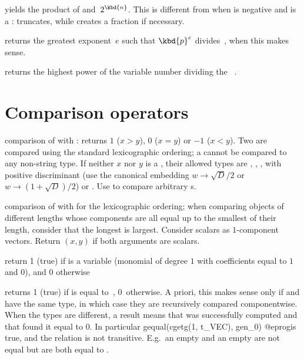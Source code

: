  yields the product of 
and~$2^{\kbd{n}}$. This is different from  when  is negative
and  is a :  truncates, while 
creates a fraction if necessary.

 returns the greatest exponent~$e$ such that
$\kbd{p}^e$ divides~, when this makes sense.

 returns the highest power of the variable
number  dividing the ~.

\section{Comparison operators}


 comparison of  with : returns
$1$ ($x > y$), $0$ ($x = y$) or $-1$ ($x < y$). Two 
are compared using the standard lexicographic ordering; a 
cannot be compared to any non-string type. If neither
$x$ nor $y$ is a , their allowed types are , ,
,  with positive discriminant (use the canonical
embedding $w \to \sqrt{D}/2$ or $w \to (1 + \sqrt{D})/2$) or .
Use  to compare arbitrary s.

 comparison of  with  for the
lexicographic ordering; when comparing objects of different lengths whose
components are all equal up to the smallest of their length, consider that
the longest is largest. Consider scalars as $1$-component vectors. Return
$(x,y)$ if both arguments are scalars.

 return 1 (true) if  is a variable
(monomial of degree $1$ with  coefficients equal to $1$ and $0$),
and $0$ otherwise

 returns 1 (true) if  is equal
to~, 0~otherwise. A priori, this makes sense only if  and
 have the same type, in which case they are recursively compared
componentwise. When the types are different, a  result
means that  was successfully computed and that
 found it equal to $0$. In particular
\bprog
  gequal(cgetg(1, t_VEC), gen_0)
@eprog\noindent is true, and the relation is not transitive. E.g.~an empty
 and an empty  are not equal but are both equal to
.

